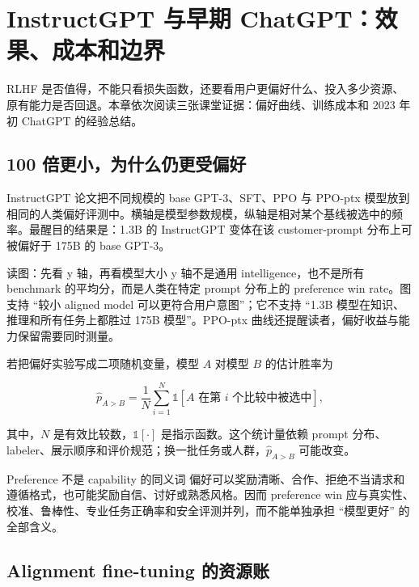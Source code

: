 \section{InstructGPT 与早期 ChatGPT：效果、成本和边界}

RLHF 是否值得，不能只看损失函数，还要看用户更偏好什么、投入多少资源、原有能力是否回退。本章依次阅读三张课堂证据：偏好曲线、训练成本和 2023 年初 ChatGPT 的经验总结。

\subsection{100 倍更小，为什么仍更受偏好}

InstructGPT 论文把不同规模的 base GPT-3、SFT、PPO 与 PPO-ptx 模型放到相同的人类偏好评测中。横轴是模型参数规模，纵轴是相对某个基线被选中的频率。最醒目的结果是：1.3B 的 InstructGPT 变体在该 customer-prompt 分布上可被偏好于 175B 的 base GPT-3。


\begin{knowledgebox}{读图：先看 y 轴，再看模型大小}
y 轴不是通用 intelligence，也不是所有 benchmark 的平均分，而是人类在特定 prompt 分布上的 preference win rate。图支持 ``较小 aligned model 可以更符合用户意图''；它不支持 ``1.3B 模型在知识、推理和所有任务上都胜过 175B 模型''。PPO-ptx 曲线还提醒读者，偏好收益与能力保留需要同时测量。
\end{knowledgebox}

若把偏好实验写成二项随机变量，模型 $A$ 对模型 $B$ 的估计胜率为

\[
\widehat{p}_{A>B}=\frac{1}{N}\sum_{i=1}^{N}\mathbb{1}[A\text{ 在第 }i\text{ 个比较中被选中}],
\]

其中，$N$ 是有效比较数，$\mathbb{1}[\cdot]$ 是指示函数。这个统计量依赖 prompt 分布、labeler、展示顺序和评价规范；换一批任务或人群，$\widehat{p}_{A>B}$ 可能改变。

\begin{warningbox}{Preference 不是 capability 的同义词}
偏好可以奖励清晰、合作、拒绝不当请求和遵循格式，也可能奖励自信、讨好或熟悉风格。因而 preference win 应与真实性、校准、鲁棒性、专业任务正确率和安全评测并列，而不能单独承担 ``模型更好'' 的全部含义。
\end{warningbox}

\subsection{Alignment fine-tuning 的资源账}

